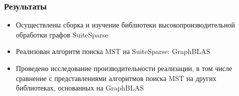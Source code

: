 \documentclass{beamer}
\begin{document}
\begin{frame}
  \transwipe[direction=90]
  \frametitle{Результаты}
  \begin{itemize}
    \item Осуществлены сборка и изучение библиотеки высокопроизводительной обработки графов SuiteSparse
    \item Реализован алгоритм поиска MST на SuiteSparse: GraphBLAS
    \item Проведено исследование производительности реализации, в том числе сравнение с представлениями алгоритмов поиска MST на других библиотеках, основанных на GraphBLAS
  \end{itemize}
\end{frame}
\end{document}
